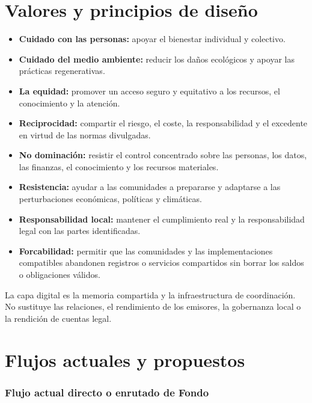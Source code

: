 \documentclass[11pt]{article}
\begin{document}
\section*{Valores y principios de diseño}

\begin{itemize}[leftmargin=*]
\item \textbf{Cuidado con las personas:} apoyar el bienestar individual y colectivo.
\item \textbf{Cuidado del medio ambiente:} reducir los daños ecológicos y apoyar las prácticas regenerativas.
\item \textbf{La equidad:} promover un acceso seguro y equitativo a los recursos, el conocimiento y la atención.
\item \textbf{Reciprocidad:} compartir el riesgo, el coste, la responsabilidad y el excedente en virtud de las normas divulgadas.
\item \textbf{No dominación:} resistir el control concentrado sobre las personas, los datos, las finanzas, el conocimiento y los recursos materiales.
\item \textbf{Resistencia:} ayudar a las comunidades a prepararse y adaptarse a las perturbaciones económicas, políticas y climáticas.
\item \textbf{Responsabilidad local:} mantener el cumplimiento real y la responsabilidad legal con las partes identificadas.
\item \textbf{Forcabilidad:} permitir que las comunidades y las implementaciones compatibles abandonen registros o servicios compartidos sin borrar los saldos o obligaciones válidos.
\end{itemize}
La capa digital es la memoria compartida y la infraestructura de coordinación. No sustituye las relaciones, el rendimiento de los emisores, la gobernanza local o la rendición de cuentas legal.

\section*{Flujos actuales y propuestos}

\subsubsection*{Flujo actual directo o enrutado de Fondo}
\end{document}
